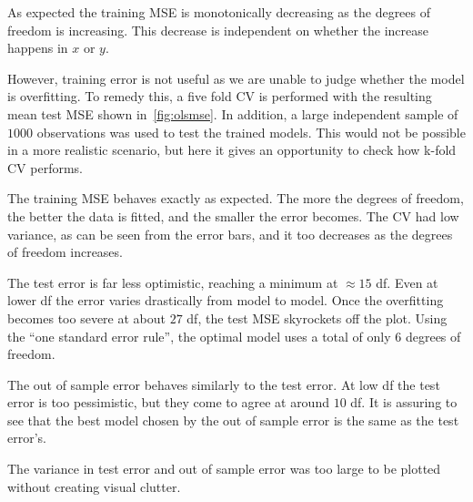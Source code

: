 As expected the training MSE is monotonically decreasing as the degrees of
freedom is increasing. This decrease is independent on whether the increase
happens in \(x\) or \(y\).

However, training error is not useful as we are unable to judge whether the
model is overfitting. To remedy this, a five fold CV is performed with the
resulting mean test MSE shown in~\cref{fig:olsmse}. In addition,  a large independent sample of
\(1000\) observations was used to test the trained models. This would not be
possible in a more realistic scenario, but here it gives an opportunity to check
how k-fold CV performs.

The training MSE behaves exactly as expected. The more the degrees of freedom,
the better the data is fitted, and the smaller the error becomes. The CV had low
variance, as can be seen from the error bars, and it too decreases as the
degrees of freedom increases.

The test error is far less optimistic, reaching a minimum at \(\approx 15\) df.
Even at lower df the error varies drastically from model to model. Once the
overfitting becomes too severe at about \(27\) df, the test MSE skyrockets off
the plot. Using the ``one standard error rule'', the optimal model uses a total
of only \(6\) degrees of freedom.

The out of sample error behaves similarly to the test error. At low df the
test error is too pessimistic, but they come to agree at around \(10\) df.
It is assuring to see that the best model chosen by the out of sample error is
the same as the test error's. 

The variance in test error and out of sample error was too large to be plotted
without creating visual clutter.

